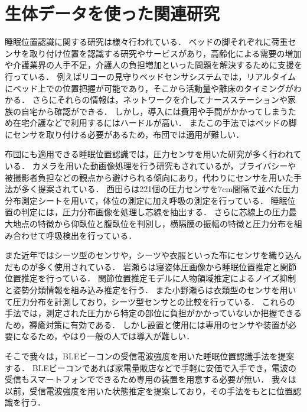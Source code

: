 \section{生体データを使った関連研究}
睡眠位置認識に関する研究は様々行われている．
ベッドの脚それぞれに荷重センサを取り付け位置を認識する研究\cite{ML}やサービスがあり，高齢化による需要の増加や介護業界の人手不足，介護人の負担増加といった問題を解決するために支援を行っている．
例えばリコーの見守りベッドセンサシステム\cite{riko}では，リアルタイムにベッド上での位置把握が可能であり，そこから活動量や離床のタイミングがわかる．
さらにそれらの情報は，ネットワークを介してナースステーションや家族の自宅から確認ができる．
しかし，導入には費用や手間がかかってしまうため在宅介護などで利用するにはハードルが高い．
またこの手法ではベッドの脚にセンサを取り付ける必要があるため，布団では適用が難しい．


布団にも適用できる睡眠位置認識では，圧力センサを用いた研究が多く行われている．
カメラを用いた動画像処理を行う研究\cite{Multimodal}もされているが，プライバシーや被撮影者負担などの観点から避けられる傾向にあり，代わりにセンサを用いた手法が多く提案されている．
西田らは221個の圧力センサを7cm間隔で並べた圧力分布測定シートを用いて，体位の測定に加え呼吸の測定を行っている\cite{atu}．
睡眠位置の判定には，圧力分布画像を処理し芯線を抽出する．
さらに芯線上の圧力最大地点の特徴から仰臥位と腹臥位を判別し，横隔膜の振幅の特徴と圧力分布を組み合わせて呼吸検出を行っている．


また近年ではシーツ型のセンサや，シーツや衣服といった布にセンサを織り込んだものが多く使用されている\cite{orimono, seat}．
岩瀬らは寝姿体圧画像から睡眠位置推定と関節位置推定を行っている\cite{kansetu}．
関節位置推定モデルに人物領域推定によるノイズ抑制と姿勢分類情報を組み込み推定を行う．%
また小野瀬らは衣類型のセンサを用いて圧力分布を計測しており，シーツ型センサとの比較を行っている\cite{irui_hikaku}．
これらの手法では，測定された圧力から特定の部位に負担がかかっていないか把握できるため，褥瘡対策に有効である．
しかし設置と使用には専用のセンサや装置が必要になるため，やはり一般の人では導入が難しい．





そこで我々は，BLEビーコンの受信電波強度を用いた睡眠位置認識手法を提案する．
BLEビーコンであれば家電量販店などで手軽に安価で入手でき，電波の受信もスマートフォンでできるため専用の装置を用意する必要が無い．
我々は以前，受信電波強度を用いた状態推定を提案しており，その手法をもとに位置認識を行う．


